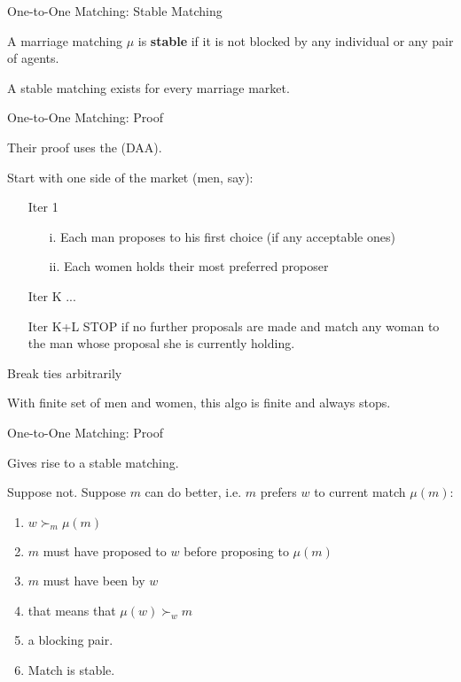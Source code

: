 \documentclass{beamer}%
\begin{document}
\begin{frame}{One-to-One Matching: Stable Matching}
\begin{tcolorbox}[colback=red!5!white,colframe=red!75!black,title=Definition: Stable Matching,fonttitle=\bfseries] 
A marriage matching $\mu$ is \textbf{stable} if it is not blocked by any individual or any pair of agents.
\end{tcolorbox}
\bigskip
\bigskip
\begin{tcolorbox}[colback=blue!5!white,colframe=blue!75!black,title=Theorem: Gale and Shapley (1962),fonttitle=\bfseries]A stable matching exists for every marriage market. 
\end{tcolorbox}
\end{frame}


\begin{frame}{One-to-One Matching: Proof}
\begin{midi}
\item Their proof uses the  (DAA).
\item Start with one side of the market (men, say):
	\begin{enumerate}
		\item[Iter 1] \hspace{1cm}
		\begin{enumerate}
			\item[i.] Each man proposes to his first choice (if any acceptable ones)
			\item[ii.] Each women holds their most preferred proposer
		\end{enumerate}
		\item[Iter K] ...
		\item[Iter K+L] STOP if no further proposals are made and match any woman to the man whose proposal she is currently holding.
	\end{enumerate}
\item Break ties arbitrarily
\item With finite set of men and women, this algo is finite and always stops.
\end{midi}
\end{frame}

\begin{frame}{One-to-One Matching: Proof}
\begin{midi}
\item Gives rise to a stable matching.
\item Suppose not. Suppose $m$ can do better, i.e. $m$ prefers $w$ to current match $\mu(m)$:
\begin{enumerate}
\item $w\succ_m \mu(m)$
\item $m$ must have proposed to $w$ before proposing to $\mu(m)$
\item $m$ must have been  by $w$
\item that means that $\mu(w) \succ_w m$
\item {} a blocking pair.
\item Match is stable.
\end{enumerate}
\end{midi}
\end{frame}
\end{document}
